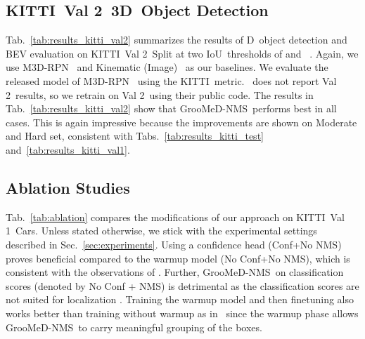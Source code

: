 \documentclass[final]{cvpr}
\newcommand{\myReferTable}[1]{Tab.~\ref{#1}}
\newcommand{\myReferSection}[1]{Sec.~\ref{#1}}
\newcommand{\methodName}{GrooMeD-NMS}
\newcommand{\iou}{IoU}
\newcommand{\threeD}{D}
\newcommand{\iouThreeD}{\iou}
\newcommand{\kitti}{KITTI}
\newcommand{\valOne}{Val 1}
\newcommand{\valTwo}{Val 2}
\begin{document}
\subsection{\kitti~\valTwo~3D~Object Detection}\label{sec:results_kitti_val2}
        \myReferTable{tab:results_kitti_val2} summarizes the results of \threeD~object detection and BEV evaluation on \kitti~\valTwo~Split at two \iouThreeD~thresholds of  and ~\cite{chen2020monopair,brazil2020kinematic}. 
        Again, we use M3D-RPN~\cite{brazil2019m3d} and Kinematic (Image)~\cite{brazil2020kinematic} as our baselines. 
        We evaluate the released model of M3D-RPN~\cite{brazil2019m3d} using the \kitti~metric.~\cite{brazil2020kinematic} does not report \valTwo~results, so we retrain on \valTwo~using their public code. 
        The results in \myReferTable{tab:results_kitti_val2} show that \methodName~performs best in all cases. 
        This is again impressive because the improvements are shown on Moderate and Hard set, consistent with Tabs.~\ref{tab:results_kitti_test} and~\ref{tab:results_kitti_val1}.    


\subsection{Ablation Studies}\label{sec:results_ablation}
        \myReferTable{tab:ablation} compares the modifications of our approach on \kitti~\valOne~Cars. 
        Unless stated otherwise, we stick with the experimental settings described in \myReferSection{sec:experiments}. 
        Using a confidence head (Conf+No NMS) proves beneficial compared to the warmup model (No Conf+No NMS), which is consistent with the observations of \cite{shi2020distance, brazil2020kinematic}. 
        Further, \methodName~on classification scores (denoted by No Conf + NMS) is detrimental as the classification scores are not suited for localization \cite{huang2020epnet, brazil2020kinematic}. 
        Training the warmup model and then finetuning also works better than training without warmup as in~\cite{brazil2020kinematic} since the warmup phase allows \methodName~to carry meaningful grouping of the boxes. 
        
\end{document}

